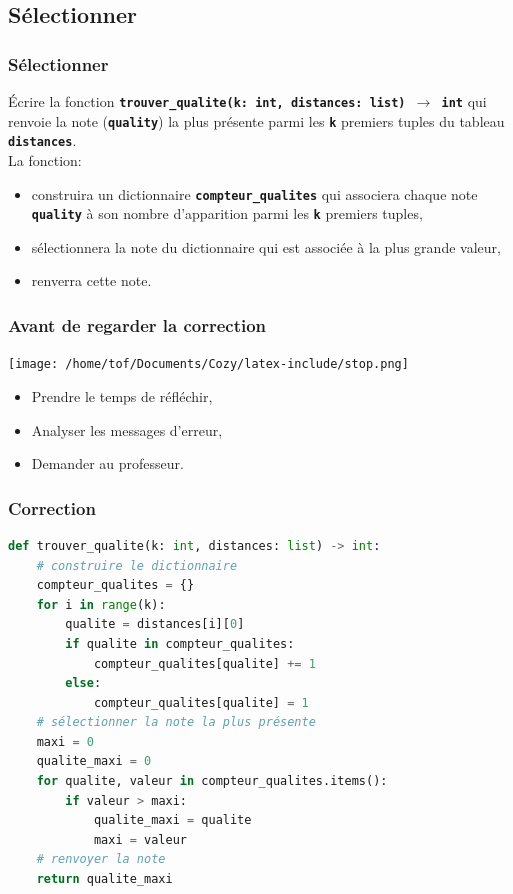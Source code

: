 \documentclass[svgnames,11pt]{beamer}
\begin{document}
\subsection{Sélectionner}
\begin{frame}
    \frametitle{Sélectionner}

    \begin{activite}
    Écrire la fonction \textbf{\texttt{trouver\_qualite(k: int, distances: list) $\rightarrow$ int}} qui renvoie la note (\textbf{\texttt{quality}}) la plus présente parmi les \textbf{\texttt{k}} premiers tuples du tableau \textbf{\texttt{distances}}.
    \\La fonction:
    \begin{itemize}
        \item construira un dictionnaire \textbf{\texttt{compteur\_qualites}} qui associera chaque note \textbf{\texttt{quality}} à son nombre d'apparition parmi les \textbf{\texttt{k}} premiers tuples,
        \item sélectionnera la note du dictionnaire qui est associée à la plus grande valeur,
        \item renverra cette note.
    \end{itemize}
    \end{activite}

\end{frame}
\begin{frame}
    \frametitle{Avant de regarder la correction}
\begin{center}
    \centering
    \texttt{[image: /home/tof/Documents/Cozy/latex-include/stop.png]}
    \end{center}
{\Large
    \begin{itemize}
        \item Prendre le temps de réfléchir,
        \item Analyser les messages d'erreur,
        \item Demander au professeur.
    \end{itemize}
}
\end{frame}
\begin{frame}[fragile]
    \frametitle{Correction}

\begin{center}
\begin{lstlisting}[language=Python , basicstyle=\ttfamily\small, xleftmargin=0.2em, xrightmargin=-1em]
def trouver_qualite(k: int, distances: list) -> int:
    # construire le dictionnaire
    compteur_qualites = {}
    for i in range(k):
        qualite = distances[i][0]
        if qualite in compteur_qualites:
            compteur_qualites[qualite] += 1
        else:
            compteur_qualites[qualite] = 1
    # sélectionner la note la plus présente
    maxi = 0
    qualite_maxi = 0
    for qualite, valeur in compteur_qualites.items():
        if valeur > maxi:
            qualite_maxi = qualite
            maxi = valeur    
    # renvoyer la note
    return qualite_maxi
\end{lstlisting}
\end{center}

\end{frame}
\end{document}
